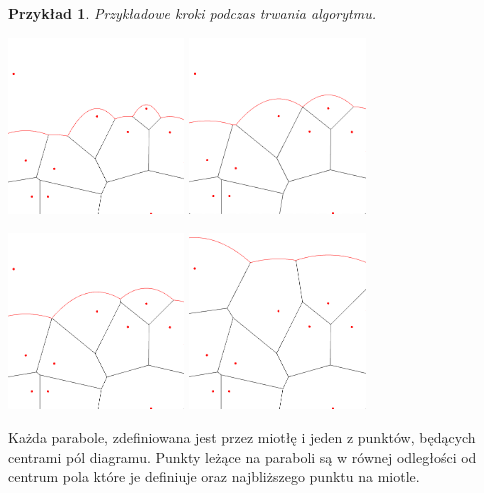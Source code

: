 \documentclass[declaration,shortabstract, inz]{iithesis}
\theoremstyle{definition} \newtheorem{definition}{Definicja}[]
\theoremstyle{plain} \newtheorem{remark}[definition]{Obserwacja}
\theoremstyle{plain} \newtheorem{theorem}[definition]{Twierdzenie}
\theoremstyle{plain} \newtheorem{example}{Przykład}[definition]
\theoremstyle{plain} \newtheorem{lemma}[definition]{Lemat}
\begin{document}
\begin{example}
Przykładowe kroki podczas trwania algorytmu.

	\begin{center}
		\includegraphics[width=0.35\textwidth]{fortune2}
		\includegraphics[width=0.35\textwidth]{fortune3}
	\end{center}
	\begin{center}
		\includegraphics[width=0.35\textwidth]{fortune4}
		\includegraphics[width=0.35\textwidth]{fortune5}
	\end{center}
\end{example}

Każda parabole, zdefiniowana jest przez miotłę i jeden z punktów, będących centrami pól diagramu. Punkty leżące na paraboli są w równej odległości od centrum pola które je definiuje oraz najbliższego punktu na miotle.
\end{document}
